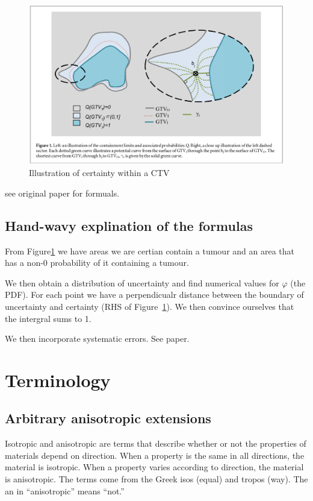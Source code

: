 \documentclass[11pt]{article}
\begin{document}
\begin{figure}[H]
    \centering
    \includegraphics[width=\textwidth]{images/PDF-of-CTV.png}
    \caption{Illustration of certainty within a CTV}
   \label{fig:pdf-of-ctv}
\end{figure}

see original paper for formuals.

\subsection{Hand-wavy explination of the formulas}

From Figure\ref{fig:pdf-of-ctv} we have areas we are certian contain a tumour and an area that has a non-0 probability of it containing a tumour. 

We then obtain a distribution of uncertainty and find numerical values for $\varphi$ (the PDF). For each point we have a perpendicualr distance between the boundary of uncertainty and certainty (RHS of Figure~\ref{fig:pdf-of-ctv}). We then convince ourselves that the intergral sums to 1.

We then incorporate systematic errors. See paper.

\section{Terminology}

\subsection{Arbitrary anisotropic extensions}\label{term:arbitrary-anisotropic-extensions}

Isotropic and anisotropic are terms that describe whether or not the properties of materials depend on direction. When a property is the same in all directions, the material is isotropic. When a property varies according to direction, the material is anisotropic. The terms come from the Greek isos (equal) and tropos (way). The an in “anisotropic” means “not.”~\cite{anisotropy}
\end{document}
